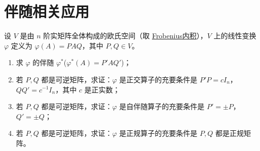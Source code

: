 \documentclass[../../main.tex]{subfiles}%
\begin{document}
\section{伴随相关应用}

\begin{proposition}\label{proposition:例9.29}
设 \(V\) 是由 \(n\) 阶实矩阵全体构成的欧氏空间（取 \hyperlink{Frobenius 内积}{Frobenius内积}），\(V\) 上的线性变换 \(\varphi\) 定义为 \(\varphi(A)=PAQ\)，其中 \(P,Q\in V\)。
\begin{enumerate}[(1)]
\item 求 \(\varphi\) 的伴随 \(\varphi^*\)($\varphi^*(A)=P'AQ'$)；
\item 若 \(P,Q\) 都是可逆矩阵，求证：\(\varphi\) 是正交算子的充要条件是 \(P'P = cI_n\)，\(QQ' = c^{-1}I_n\)，其中 \(c\) 是正实数；
\item 若 \(P,Q\) 都是可逆矩阵，求证：\(\varphi\) 是自伴随算子的充要条件是 \(P' = \pm P\)，\(Q' = \pm Q\)；
\item 若 \(P,Q\) 都是可逆矩阵，求证：\(\varphi\) 是正规算子的充要条件是 \(P,Q\) 都是正规矩阵。
\end{enumerate}
\end{proposition}
\end{document}
